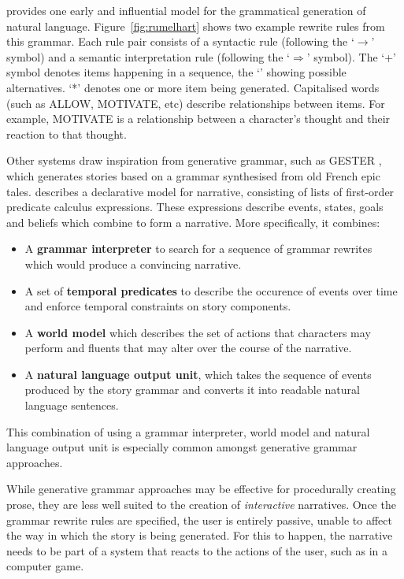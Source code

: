 \documentclass[11pt]{report}
\begin{document}
\citet{rumelhart1975notes} provides one early and influential model for the
grammatical generation of natural language. Figure~\ref{fig:rumelhart} shows two
example rewrite rules from this grammar. Each rule pair consists of a
syntactic rule (following the `$\rightarrow$' symbol) and a semantic
interpretation rule (following the `$\Rightarrow$' symbol). The `+' symbol denotes items happening in a sequence, the `\textbar' showing possible alternatives. `*' denotes one or more item being generated. Capitalised words (such as ALLOW, MOTIVATE, etc) describe relationships between items. For example, MOTIVATE is a relationship between a character's thought and their reaction to that thought.

Other systems draw inspiration from generative grammar, such as GESTER \citep{pemberton1989modular}, which generates stories based on a grammar synthesised from old French epic tales. \citet{lang1999declarative} describes a declarative model for narrative, consisting of lists of first-order predicate calculus expressions. These expressions describe events, states, goals and beliefs which combine to form a narrative. More specifically, it combines:

\begin{itemize}
  \item A \textbf{grammar interpreter} to search for a sequence of grammar rewrites which would produce a convincing narrative.
  \item A set of \textbf{temporal predicates} to describe the occurence of events over time and enforce temporal constraints on story components.
  \item A \textbf{world model} which describes the set of actions that characters may perform and fluents that may alter over the course of the narrative.
  \item A \textbf{natural language output unit}, which takes the sequence of events produced by the story grammar and converts it into readable natural language sentences.
\end{itemize}

This combination of using a grammar interpreter, world model and natural language output unit is especially common amongst generative grammar approaches.

While generative grammar approaches may be effective for procedurally creating
prose, they are less well suited to the creation of \emph{interactive}
narratives. Once the grammar rewrite rules are specified, the user is entirely
passive, unable to affect the way in which the story is being generated. For
this to happen, the narrative needs to be part of a system that reacts to the
actions of the user, such as in a computer game.
\end{document}
